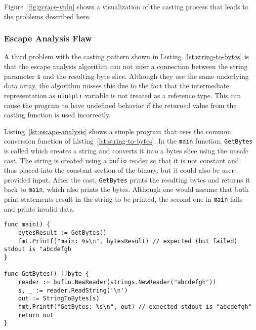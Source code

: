 

Figure~\ref{fig:gcrace-vuln} shows a visualization of the casting process that leads to the problems described here.


\subsubsection*{Escape Analysis Flaw}

A third problem with the casting pattern shown in Listing~\ref{lst:string-to-bytes} is that the escape analysis algorithm can not infer a connection between the string parameter \texttt{s} and the resulting byte slice.
Although they use the same underlying data array, the algorithm misses this due to the fact that the intermediate representation as \texttt{uintptr} variable is not treated as a reference type.
This can cause the program to have undefined behavior if the returned value from the casting function is used incorrectly.

Listing~\ref{lst:escape-analysis} shows a simple program that uses the common conversion function of Listing~\ref{lst:string-to-bytes}.
In the \texttt{main} function, \texttt{GetBytes} is called which creates a string and converts it into a bytes slice using the unsafe cast.
The string is created using a \texttt{bufio} reader so that it is not constant and thus placed into the constant section of the binary, but it could also be user-provided input.
After the cast, \texttt{GetBytes} prints the resulting bytes and returns it back to \texttt{main}, which also prints the bytes.
Although one would assume that both print statements result in the string to be printed, the second one in \texttt{main} fails and prints invalid data.

\begin{lstlisting}[language=Golang, label=lst:escape-analysis, caption=Escape Analysis Flaw]
func main() {
	bytesResult := GetBytes()
	fmt.Printf("main: %s\n", bytesResult) // expected (but failed) stdout is "abcdefgh
}

func GetBytes() []byte {
	reader := bufio.NewReader(strings.NewReader("abcdefgh"))
	s, _ := reader.ReadString('\n')
	out := StringToBytes(s)
	fmt.Printf("GetBytes: %s\n", out) // expected stdout is "abcdefgh"
	return out
}
\end{lstlisting}

